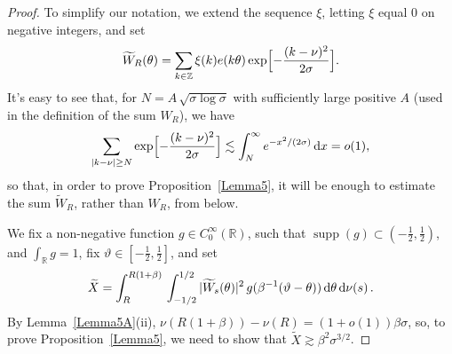 \documentclass[11pt]{amsart}
\numberwithin{equation}{section}
\newcommand{\bR}{\mathbb R}
\newcommand{\bZ}{\mathbb Z}
\begin{document}
\begin{proof}
To simplify our notation, we extend the sequence $\xi$, letting $\xi$ equal $0$
on negative integers, and set
\[
\widetilde{W}_R(\theta)
= \sum_{k\in\bZ} \xi(k)e(k\theta)\exp\Bigl[ - \frac{(k-\nu)^2}{2\sigma} \Bigr].
\]
It's easy to see that, for $N = A\,\sqrt{\sigma\log\sigma}$ with sufficiently large positive
$A$ (used in the definition of the sum $W_R$), we have
\[
\sum_{|k-\nu|\ge N} \exp\Bigl[ - \frac{(k-\nu)^2}{2\sigma} \Bigr] \lesssim
\int_N^\infty e^{-x^2/(2\sigma)}\, {\rm d}x = o(1),
\]
so that, in order to prove Proposition~\ref{Lemma5}, it will be enough to estimate the sum
$\widetilde{W}_R$, rather than $W_R$, from below.

We fix a non-negative function $g\in C_0^\infty(\bR)$, such that $\operatorname{supp}(g)\subset (-\tfrac12, \tfrac12)$, and $\displaystyle \int_\bR g = 1$, fix $\vartheta\in [-\tfrac12, \tfrac12]$,
and set
\[
\widetilde{X} =
\int_R^{R(1+\beta)}\, \int_{-1/2}^{1/2} |\widetilde{W}_s(\theta)|^2\,
g(\beta^{-1}(\vartheta-\theta))\, {\rm d}\theta\, {\rm d}\nu (s)\,.
\]
By Lemma~\ref{Lemma5A}(ii), $\nu(R(1+\beta))-\nu(R) = (1+o(1))\beta\sigma$, so, to prove Proposition~\ref{Lemma5}, 
we need to show that $\widetilde{X} \gtrsim \beta^2\sigma^{3/2}$.


\end{proof}
\end{document}

